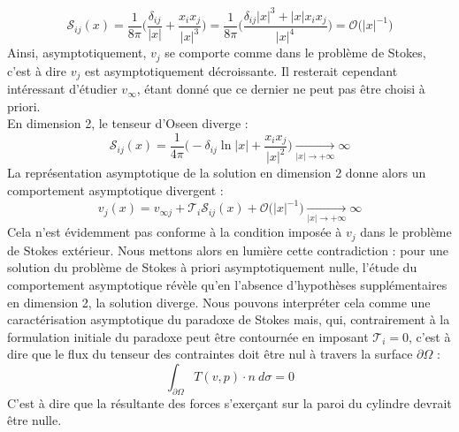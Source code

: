 $$ \mathscr{S}_{ij}(x) = \frac{1}{8\pi}\bigg( \frac{\delta_{ij}}{|x|} + \frac{x_i x_j}{|x|^3} \bigg) = \frac{1}{8\pi} \bigg( \frac{\delta_{ij}|x|^3 + |x|x_i x_j}{|x|^4} \bigg) = \mathcal{O}\big( |x|^{-1} \big) $$
Ainsi, asymptotiquement, $v_j$ se comporte comme dans le problème de Stokes, c'est à dire $v_j$ est asymptotiquement décroissante. Il resterait cependant intéressant d'étudier $v_{\infty}$, étant donné que ce dernier ne peut pas être choisi à priori.\\
En dimension 2, le tenseur d'Oseen diverge : 
$$\mathscr{S}_{ij}(x) = \frac{1}{4\pi}\bigg(-\delta_{ij}\ln |x| + \frac{x_i x_j}{|x|^2}\bigg) \xrightarrow[|x| \to +\infty]{} \infty$$
La représentation asymptotique de la solution en dimension 2 donne alors un comportement asymptotique divergent :
$$ v_j(x) = v_{\infty j} + \mathcal{T}_i \mathscr{S}_{ij}(x) + \mathcal{O}\big(|x|^{-1}\big) \xrightarrow[|x| \to +\infty]{} \infty $$
Cela n'est évidemment pas conforme à la condition imposée à $v_j$ dans le problème de Stokes extérieur. Nous mettons alors en lumière cette contradiction : pour une solution du problème de Stokes à priori asymptotiquement nulle, l'étude du comportement asymptotique révèle qu'en l'absence d'hypothèses supplémentaires en dimension 2, la solution diverge.
Nous pouvons interpréter cela comme une caractérisation asymptotique du paradoxe de Stokes mais, qui, contrairement à la formulation initiale du paradoxe peut être contournée en imposant $\mathcal{T}_i = 0$, c'est à dire que le flux du tenseur des contraintes doit être nul à travers la surface $\partial \Omega$ :
$$ \int_{\partial \Omega} T(v,p)\cdot n \ d\sigma = 0 $$
C'est à dire que la résultante des forces s'exerçant sur la paroi du cylindre devrait être nulle.